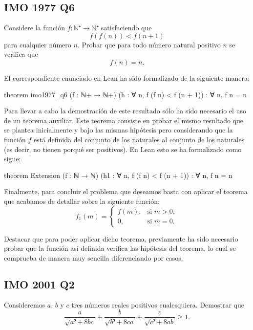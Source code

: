 \subsection{IMO 1977 Q6}

\noindent
Considere la función
\(f:ℕ⁺ → ℕ⁺\) satisfaciendo que
\[f(f(n)) < f(n+1)\]
para cualquier número \(n\). Probar que para todo número
natural positivo \(n\) se verifica que
\[f(n) = n.\]

El correspondiente enunciado en Lean ha sido formalizado de la siguiente
manera:
\begin{leancode}
theorem imo1977_q6
  (f : ℕ+ → ℕ+)
  (h : ∀ n, f (f n) < f (n + 1))
  : ∀ n, f n = n
\end{leancode}

Para llevar a cabo la demostración de este resultado sólo ha sido
necesario el uso de un teorema auxiliar. Este teorema consiste en probar
el mismo resultado que se plantea inicialmente y bajo las mismas
hipótesis pero considerando que la función \(f\) está definida del
conjunto de los naturales al conjunto de los naturales (es decir, no
tienen porqué ser positivos). En Lean esto se ha formalizado como sigue:
\begin{leancode}
theorem Extension
  (f : ℕ → ℕ)
  (h1 : ∀ n, f (f n) < f (n + 1))
  : ∀ n, f n = n
\end{leancode}

Finalmente, para concluir el problema que deseamos basta con aplicar el
teorema que acabamos de detallar sobre la siguiente función:
 \begin{equation}
    f_1(m)=\left\lbrace\begin{array}{ll}
                         f(m), & \text{si } m>0, \\
                         0, & \text{si } m=0.
                       \end{array}\right.
\end{equation}

Destacar que para poder aplicar dicho teorema, previamente ha sido
necesario probar que la función así definida verifica las hipótesis del
teorema, lo cual se comprueba de manera muy sencilla diferenciando por
casos.

\subsection{IMO 2001 Q2}

\noindent
Consideremos \(a\), \(b\) y \(c\) tres números reales positivos
cualesquiera. Demostrar que
\begin{equation}\label{iintroq2}
  \frac{a}{\sqrt{a²+8bc}} +
  \frac{b}{\sqrt{b²+8ca}} +
  \frac{c}{\sqrt{c²+8ab}} ≥ 1.
\end{equation}

